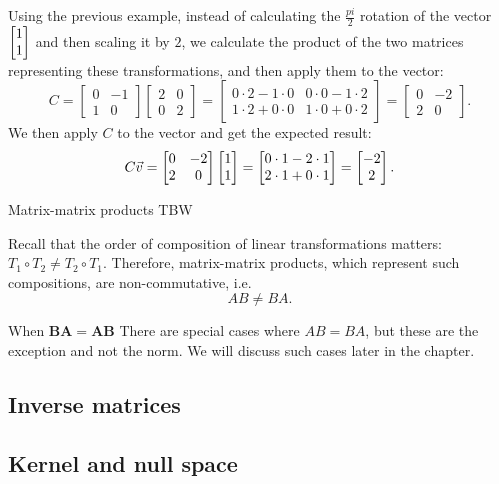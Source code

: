 Using the previous example, instead of calculating the $\frac{pi}{2}$ rotation of the vector $\colvec{1;1}$ and then scaling it by $2$, we calculate the product of the two matrices representing these transformations, and then apply them to the vector:
\[
	C=\begin{bmatrix} 0 & -1\\1 & 0 \end{bmatrix}\begin{bmatrix} 2 & 0\\0 & 2 \end{bmatrix} =
	\begin{bmatrix}
		0\cdot2-1\cdot0 & 0\cdot0-1\cdot2\\
		1\cdot2+0\cdot0 & 1\cdot0+0\cdot2
		\end{bmatrix} = \begin{bmatrix} 0 & -2\\2 & 0 \end{bmatrix}.
\]
We then apply $C$ to the vector and get the expected result:
\[
	C\vec{v} = \begin{bmatrix} 0 & -2\\2 & 0 \end{bmatrix} \colvec{1;1} = \colvec{0\cdot1-2\cdot1;2\cdot1+0\cdot1} = \colvec{-2;2}.
\]

\begin{example}{Matrix-matrix products}{}
	TBW
\end{example}

Recall that the order of composition of linear transformations matters: $T_{1}\circ T_{2} \neq T_{2}\circ T_{1}$. Therefore, matrix-matrix products, which represent such compositions, are non-commutative, i.e.
\begin{equation}
	AB\neq BA.
	\label{eq:matrix_matrix_product_non_commutative}
\end{equation}
\begin{note}{When $\bm{BA=AB}$}{}
There are special cases where $AB=BA$, but these are the exception and not the norm. We will discuss such cases later in the chapter.
\end{note}


\subsection{Inverse matrices}
\subsection{Kernel and null space}
